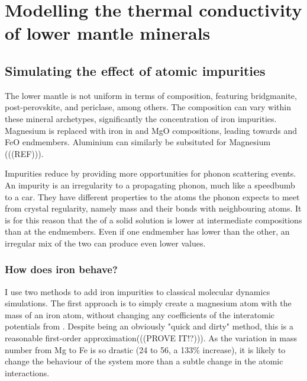 \chapter{Modelling the thermal conductivity of lower mantle minerals} %

\label{Chapter4} %

\section{Simulating the effect of atomic impurities}

The lower mantle is not uniform in terms of composition, featuring bridgmanite, post-perovskite, and periclase, among others. The composition can vary within these mineral archetypes, significantly the concentration of iron impurities. Magnesium is replaced with iron in 
\mgsios and MgO compositions, leading towards \fesios and FeO endmembers. Aluminium can similarly be subsituted for Magnesium (((REF))).

Impurities reduce \tcs by providing more opportunities for phonon scattering events. An impurity is an irregularity to a propagating phonon, much like a speedbumb to a car. They have different properties to the atoms the phonon expects to meet from crystal regularity, namely mass and their bonds with neighbouring atoms. It is for this reason that the \tcs of a solid solution is lower at intermediate compositions than at the endmembers. Even if one endmember has lower \cs than the other, an irregular mix of the two can produce even lower values.

\subsection{How does iron behave?} 

I use two methods to add iron impurities to classical molecular dynamics simulations. The first approach is to simply create a magnesium atom with the mass of an iron atom, without changing any coefficients of the interatomic potentials from \citet{Oganov2008}. Despite being an obviously "quick and dirty" method, this is a reasonable first-order approximation(((PROVE IT!?))). As the variation in mass number from Mg to Fe is so drastic (24 to 56, a 133\% increase), it is likely to change the behaviour of the system more than a subtle change in the atomic interactions.

